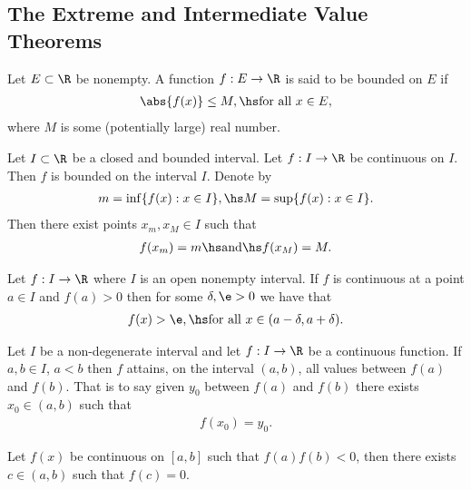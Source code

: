 \documentclass{article}
\begin{document}
\subsection{The Extreme and Intermediate Value Theorems}

\begin{definition}
    Let $E\subset\R$ be nonempty. A function $f:E\to\R$ is said to be
    bounded on $E$ if
    \begin{align*}
        \abs{f(x)}\leq M,\hs\text{for all } x\in E,
    \end{align*}
    where $M$ is some (potentially large) real number.
\end{definition}

\begin{theorem}
    Let $I\subset\R$ be a closed and bounded interval. Let
    $f:I\to\R$ be continuous on $I$. Then $f$ is bounded on the interval
    $I$. Denote by
    \begin{align*}
        m=\inf\{f(x):x\in I\},\hs M=\sup\{f(x):x\in I\}.
    \end{align*} 
    Then there exist points $x_m,x_M\in I$ such that
    \begin{align*}
        f(x_m)=m\hs\text{and}\hs f(x_M)=M.
    \end{align*}
\end{theorem}

\setcounter{theorem}{3}
\begin{lemma}
    Let $f:I\to\R$ where $I$ is an open nonempty interval. If $f$ is
    continuous at a point $a\in I$ and $f(a)>0$ then for some
    $\delta,\e>0$ we have that
    \begin{align*}
        f(x)>\e,\hs \text{for all }x\in(a-\delta, a+\delta).
    \end{align*}
\end{lemma}

\begin{theorem}
    Let $I$ be a non-degenerate interval and let $f:I\to\R$ be a
    continuous function. If $a,b\in I$, $a<b$ then $f$ attains,
    on the interval $(a,b)$, all values between $f(a)$ and $f(b)$.
    That is to say given $y_0$ between $f(a)$ and $f(b)$ there
    exists $x_0\in(a,b)$ such that
    \begin{align*}
        f(x_0)=y_0.
    \end{align*} 
\end{theorem}

\begin{theorem}
    Let $f(x)$ be continuous on $[a,b]$ such that $f(a)f(b)<0$, 
    then there exists $c\in(a,b)$ such that $f(c)=0$. 
\end{theorem}
\end{document}

